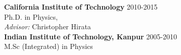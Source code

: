 \documentclass{article}
\newlength{\cvindent}
\newenvironment{cvblock}{\noindent\hspace*{\cvindent}\begin{minipage}{\dimexpr\textwidth-\cvindent\relax}}{\end{minipage}\par}
\begin{document}
\begin{cvblock}
	\noindent \textbf{California Institute of Technology} \hfill 2010-2015\\ 
	Ph.D. in Physics, \\
	\textit{Advisor:} Christopher Hirata\\
	
	\noindent \textbf{Indian Institute of Technology, Kanpur} \hfill 2005-2010\\
	M.Sc (Integrated) in Physics\\ %
\end{cvblock}
%
%
%
%
\end{document}
